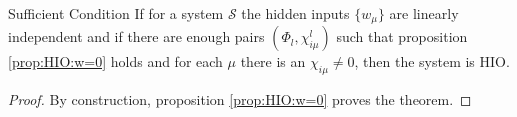 \begin{theorem}{Sufficient Condition}{}
	If for a system $\mathcal{S}$ the hidden inputs $\{w_\mu \}$ are linearly independent 
	and if there are enough pairs $(\Phi_l,\chi^l_{i\mu})$ 
	such that proposition \ref{prop:HIO:w=0} holds and for each $\mu$ there is an 
	$\chi_{i\mu}\neq 0$, then the system is HIO.
\end{theorem}
\begin{proof}
	By construction, proposition \ref{prop:HIO:w=0} proves the theorem.
\end{proof}